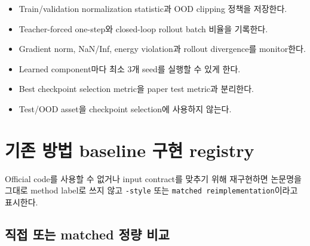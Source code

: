 \documentclass[10pt,a4paper]{article}
\newcommand{\todo}{\textcolor{TodoGray}{\(\square\)}}
\newcommand{\code}[1]{\texttt{#1}}
\begin{document}
\begin{itemize}
  \item[\todo] Train/validation normalization statistic과 OOD clipping 정책을 저장한다.
  \item[\todo] Teacher-forced one-step와 closed-loop rollout batch 비율을 기록한다.
  \item[\todo] Gradient norm, NaN/Inf, energy violation과 rollout divergence를 monitor한다.
  \item[\todo] Learned component마다 최소 3개 seed를 실행할 수 있게 한다.
  \item[\todo] Best checkpoint selection metric을 paper test metric과 분리한다.
  \item[\todo] Test/OOD asset을 checkpoint selection에 사용하지 않는다.
\end{itemize}

\section{기존 방법 baseline 구현 registry}

Official code를 사용할 수 없거나 input contract를 맞추기 위해 재구현하면 논문명을 그대로 method label로 쓰지 않고
\code{-style} 또는 \code{matched reimplementation}이라고 표시한다.

\subsection{직접 또는 matched 정량 비교}
\end{document}
